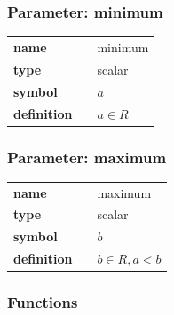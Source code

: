 \subsubsection*{Parameter: minimum}

\noindent\begin{tabular}{p{2cm}cl}
\textbf{name} & & minimum \\
\textbf{type} & & scalar \\
\textbf{symbol} & & $a$  \\
\textbf{definition} & & $a \in  R$
\end{tabular}
\subsubsection*{Parameter: maximum}

\noindent\begin{tabular}{p{2cm}cl}
\textbf{name} & & maximum \\
\textbf{type} & & scalar \\
\textbf{symbol} & & $b$  \\
\textbf{definition} & & $b \in R, a < b$
\end{tabular}
\subsubsection*{Functions}


